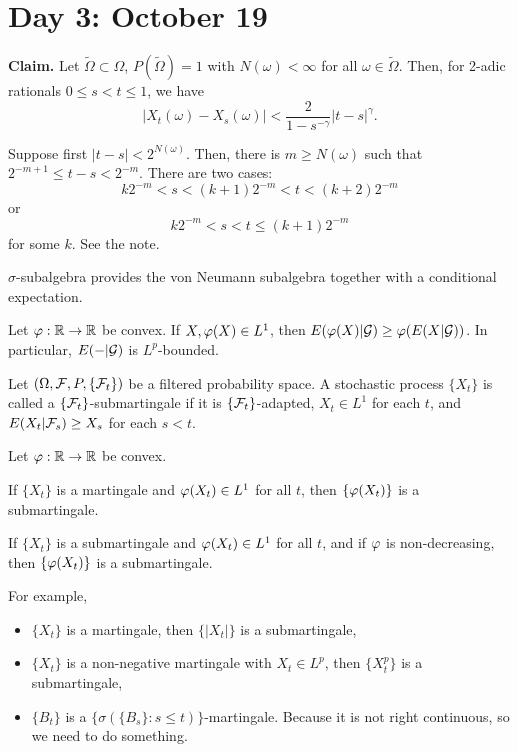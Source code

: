 \documentclass{../../../small}
\begin{document}
\newpage
\section{Day 3: October 19}

\textbf{Claim.}
Let $\tilde\Omega\subset\Omega$, $P(\tilde\Omega)=1$ with $N(\omega)<\infty$ for all $\omega\in\tilde\Omega$.
Then, for 2-adic rationals $0\le s<t\le1$, we have
\[|X_t(\omega)-X_s(\omega)|<\frac2{1-s^{-\gamma}}|t-s|^\gamma.\]
\begin{pf}
Suppose first $|t-s|<2^{N(\omega)}$.
Then, there is $m\ge N(\omega)$ such that $2^{-m+1}\le t-s<2^{-m}$.
There are two cases:
\[k2^{-m}<s<(k+1)2^{-m}<t<(k+2)2^{-m}\]
or
\[k2^{-m}<s<t\le(k+1)2^{-m}\]
for some $k$.
See the note.
\end{pf}



$\sigma$-subalgebra provides the von Neumann subalgebra together with a conditional expectation.


\begin{prop}
Let $\varphi:\mathbb{R}\to\mathbb{R}$ be convex.
If $X,\varphi(X)\in L^1$, then $E(\varphi(X)|\mathcal{G})\ge\varphi(E(X|\mathcal{G}))$.
In particular, $E(-|\mathcal{G})$ is $L^p$-bounded.
\end{prop}
\begin{defn}
Let $(\Omega,\mathcal{F},P,\{\mathcal{F}_t\})$ be a filtered probability space.
A stochastic process $\{X_t\}$ is called a $\{\mathcal{F}_t\}$-submartingale if it is $\{\mathcal{F}_t\}$-adapted, $X_t\in L^1$ for each $t$, and $E(X_t|\mathcal{F}_s)\ge X_s$ for each $s<t$.
\end{defn}

\begin{prop}
Let $\varphi:\mathbb{R}\to\mathbb{R}$ be convex.
\begin{parts}
\item If $\{X_t\}$ is a martingale and $\varphi(X_t)\in L^1$ for all $t$, then $\{\varphi(X_t)\}$ is a submartingale.
\item If $\{X_t\}$ is a submartingale and $\varphi(X_t)\in L^1$ for all $t$, and if $\varphi$ is non-decreasing, then $\{\varphi(X_t)\}$ is a submartingale.
\end{parts}
For example,
\begin{itemize}
\item $\{X_t\}$ is a martingale, then $\{|X_t|\}$ is a submartingale,
\item $\{X_t\}$ is a non-negative martingale with $X_t\in L^p$, then $\{X_t^p\}$ is a submartingale,
\
\item $\{B_t\}$ is a $\{\sigma(\{B_s\}:s\le t)\}$-martingale. Because it is not right continuous, so we need to do something.
\end{itemize}
\end{prop}
\end{document}
